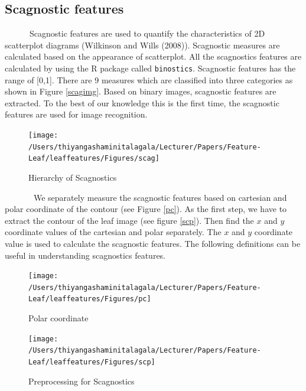 \documentclass{article}
\begin{document}
\hypertarget{scagnostic-features}{%
\subsection{Scagnostic features}\label{scagnostic-features}}

~~~~~~Scagnostic features are used to quantify the characteristics of 2D
scatterplot diagrams (Wilkinson and Wills (2008)). Scagnostic measures
are calculated based on the appearance of scatterplot. All the
scagnostics features are calculated by using the R package called
\texttt{binostics}. Scagnostic features has the range of {[}0,1{]}.
There are 9 measures which are classified into three categories as shown
in Figure \ref{scagimg}. Based on binary images, scagnostic features are
extracted. To the best of our knowledge this is the first time, the
scagnostic features are used for image recognition.

\begin{figure}[!ht]

{\centering \texttt{[image: /Users/thiyangashaminitalagala/Lecturer/Papers/Feature-Leaf/leaffeatures/Figures/scag]} 

}

\caption{\label{scagimg}Hierarchy of Scagnostics}\label{fig:unnamed-chunk-28}
\end{figure}

~~~~~~~We separately measure the scagnostic features based on cartesian
and polar coordinate of the contour (see Figure \ref{pc}). As the first
step, we have to extract the contour of the leaf image (see figure
\ref{scp}). Then find the \(x\) and \(y\) coordinate values of the
cartesian and polar separately. The \(x\) and \(y\) coordinate value is
used to calculate the scagnostic features. The following definitions can
be useful in understanding scagnostics features.

\begin{figure}[!ht]

{\centering \texttt{[image: /Users/thiyangashaminitalagala/Lecturer/Papers/Feature-Leaf/leaffeatures/Figures/pc]} 

}

\caption{\label{pc}Polar coordinate}\label{fig:unnamed-chunk-29}
\end{figure}

\begin{figure}[!ht]

{\centering \texttt{[image: /Users/thiyangashaminitalagala/Lecturer/Papers/Feature-Leaf/leaffeatures/Figures/scp]} 

}

\caption{\label{scp}Preprocessing for Scagnostics}\label{fig:unnamed-chunk-30}
\end{figure}
\end{document}

